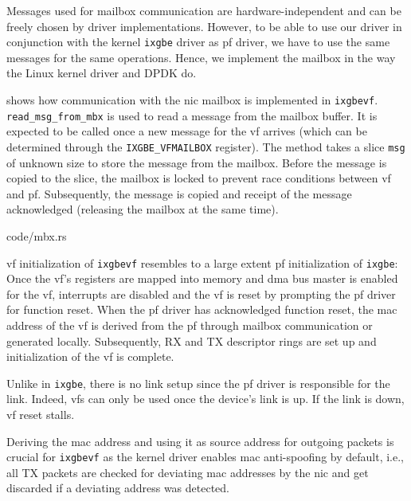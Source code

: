 Messages used for mailbox communication are hardware-independent and can be
freely chosen by driver implementations. However, to be able to use our driver
in conjunction with the kernel \texttt{ixgbe} driver as \ac{pf} driver, we have
to use the same messages for the same operations. Hence, we implement the
mailbox in the way the Linux kernel driver and DPDK do.

 shows how communication with the \ac{nic} mailbox is implemented
in \texttt{ixgbevf}. \linebreak \texttt{read\_msg\_from\_mbx} is used to read a
message from the mailbox buffer. It is expected to be called once a new message
for the \ac{vf} arrives (which can be determined through the
\texttt{IXGBE\_VFMAILBOX} register). The method takes a slice \texttt{msg} of
unknown size to store the message from the mailbox. Before the message is copied
to the slice, the mailbox is locked to prevent race conditions between \ac{vf}
and \ac{pf}. Subsequently, the message is copied and receipt of the message
acknowledged (releasing the mailbox at the same time).

\begin{minipage}{\textwidth}
     {code/mbx.rs}
\end{minipage}

\ac{vf} initialization of \texttt{ixgbevf} resembles to a large extent \ac{pf}
initialization of \texttt{ixgbe}: Once the \ac{vf}'s registers are mapped into
memory and \ac{dma} bus master is enabled for the \ac{vf}, interrupts are
disabled and the \ac{vf} is reset by prompting the \ac{pf} driver for function
reset. When the \ac{pf} driver has acknowledged function reset, the \ac{mac}
address of the \ac{vf} is derived from the \ac{pf} through mailbox communication
or generated locally. Subsequently, RX and TX descriptor rings are set up and
initialization of the \ac{vf} is complete.

Unlike in \texttt{ixgbe}, there is no link setup since the \ac{pf} driver is
responsible for the link. Indeed, \acp{vf} can only be used once the device's
link is up. If the link is down, \ac{vf} reset stalls.

Deriving the \ac{mac} address and using it as source address for outgoing
packets is crucial for \texttt{ixgbevf} as the kernel driver enables \ac{mac}
anti-spoofing by default, i.e., all TX packets are checked for deviating
\ac{mac} addresses by the \ac{nic} and get discarded if a deviating address was
detected.


